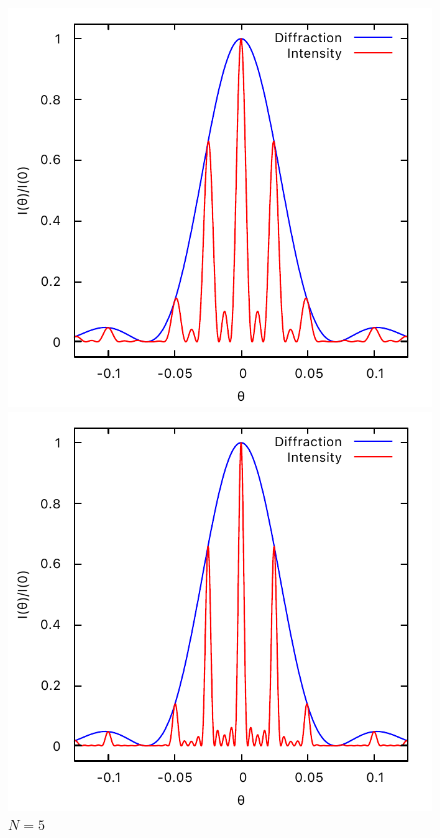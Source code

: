 \documentclass[11pt, twoside]{article}   	%
\theoremstyle{plain}
\theoremstyle{definition}
\begin{document}
\begin{description}
	\begin{figure}[htbp]
		\begin{minipage}[t]{0.33\linewidth}
		\centering
		\includegraphics[width=0.9\linewidth]{N=3}
		\caption{$N=3$}
		\end{minipage}
		\begin{minipage}[t]{0.33\linewidth}
		\centering
		\includegraphics[width=0.9\linewidth]{N=5}
		\caption{$N=5$}
		\end{minipage}

\end{figure}
\end{description}
\end{document}
